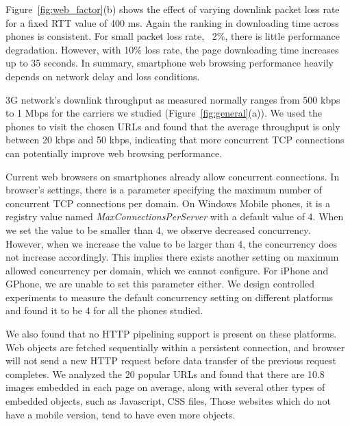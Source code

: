 Figure~\ref{fig:web_factor}(b) shows the effect of varying downlink
packet loss rate for a fixed RTT value of 400 ms. Again the ranking 
in downloading time across phones is consistent. For small packet 
loss rate, \eg~2\%, there is little performance degradation. However, 
with 10\% loss rate, the page downloading time increases up to 35 
seconds. In summary, smartphone web browsing performance heavily 
depends on network delay and loss conditions.


\label{sec:web_parallel}

3G network's downlink throughput as measured normally ranges from 500 
kbps to 1 Mbps for the carriers we studied (Figure~\ref{fig:general}(a)). 
We used the phones to visit the chosen URLs and found that the average 
throughput is only between 20 kbps and 50 kbps, indicating that 
more concurrent TCP connections can potentially improve web browsing 
performance.

Current web browsers on smartphones already allow concurrent 
connections. In browser's settings, there is a parameter specifying 
the maximum number of concurrent TCP connections per domain. On 
Windows Mobile phones, it is a registry value named 
{\em MaxConnectionsPerServer} with a default value of 4. When we 
set the value to be smaller than 4, we observe decreased 
concurrency. However, when we increase the value to be larger than 
4, the concurrency does not increase accordingly. This implies there 
exists another setting on maximum allowed concurrency per domain, 
which we cannot configure. For iPhone and GPhone, we are unable to 
set this parameter either. We design controlled experiments to measure 
the default concurrency setting on different platforms and found it 
to be 4 for all the phones studied. 

We also found that no HTTP 
pipelining support is present on these platforms.
Web objects are fetched sequentially within a persistent connection,
and browser will not send a new HTTP request before data transfer
of the previous request completes. %
We analyzed the 20 popular URLs and found that there are 10.8 images 
embedded in each page on average, along with several other types of 
embedded objects, such as Javascript, CSS files, \etc Those websites 
which do not have a mobile version, tend to have even more objects. 

